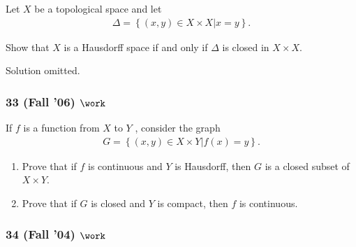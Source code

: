 \begin{problem}[?]

Let \(X\) be a topological space and let
\begin{align*}
\Delta = \left\{{(x, y) \in X \times X \mathrel{\Big|}x = y}\right\}
.\end{align*}

Show that \(X\) is a Hausdorff space if and only if \(\Delta\) is closed
in \(X \times X\).

\end{problem}

Solution omitted.

\hypertarget{fall-06-work}{%
\subsubsection{\texorpdfstring{33 (Fall '06)
\(\work\)}{33 (Fall '06) \textbackslash work}}\label{fall-06-work}}

\begin{problem}[?]

If \(f\) is a function from \(X\) to \(Y\) , consider the graph
\begin{align*}
G = \left\{{(x, y) \in X \times Y \mathrel{\Big|}f (x) = y}\right\}
.\end{align*}

\begin{enumerate}
\def\labelenumi{\alph{enumi}.}
\item
  Prove that if \(f\) is continuous and \(Y\) is Hausdorff, then \(G\)
  is a closed subset of \(X \times Y\).
\item
  Prove that if \(G\) is closed and \(Y\) is compact, then \(f\) is
  continuous.
\end{enumerate}

\end{problem}

\hypertarget{fall-04-work}{%
\subsubsection{\texorpdfstring{34 (Fall '04)
\(\work\)}{34 (Fall '04) \textbackslash work}}\label{fall-04-work}}

